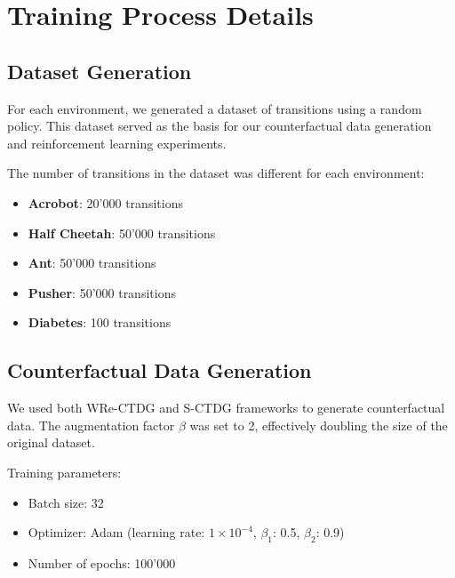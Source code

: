 \section{Training Process Details}

\subsection{Dataset Generation}

For each environment, we generated a dataset of transitions using a random policy.
This dataset served as the basis for our counterfactual
data generation and reinforcement learning experiments.

The number of transitions in the dataset was different for each environment:
\begin{itemize}
    \item \textbf{Acrobot}: 20'000 transitions
    \item \textbf{Half Cheetah}: 50'000 transitions
    \item \textbf{Ant}: 50'000 transitions
    \item \textbf{Pusher}: 50'000 transitions
    \item \textbf{Diabetes}: 100 transitions
\end{itemize}

\subsection{Counterfactual Data Generation}

We used both WRe-CTDG and S-CTDG frameworks to generate counterfactual data. The augmentation factor $\beta$ was set to 2, effectively doubling the size of the original dataset.

Training parameters:
\begin{itemize}
    \item Batch size: 32
    \item Optimizer: Adam (learning rate: $1\times 10^{-4}$, $\beta_1$: 0.5, $\beta_2$: 0.9)
    \item Number of epochs: 100'000
\end{itemize}

